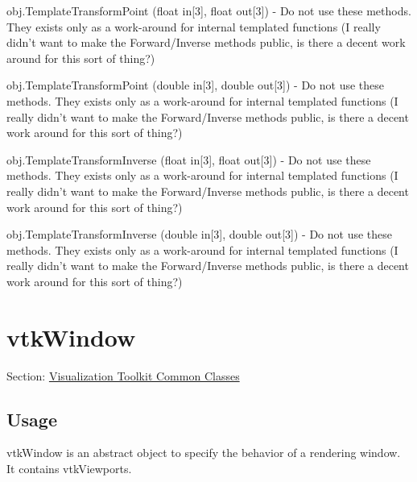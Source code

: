 \begin{DoxyItemize}
\item {\ttfamily obj.\-Template\-Transform\-Point (float in\mbox{[}3\mbox{]}, float out\mbox{[}3\mbox{]})} -\/ Do not use these methods. They exists only as a work-\/around for internal templated functions (I really didn't want to make the Forward/\-Inverse methods public, is there a decent work around for this sort of thing?)  
\item {\ttfamily obj.\-Template\-Transform\-Point (double in\mbox{[}3\mbox{]}, double out\mbox{[}3\mbox{]})} -\/ Do not use these methods. They exists only as a work-\/around for internal templated functions (I really didn't want to make the Forward/\-Inverse methods public, is there a decent work around for this sort of thing?)  
\item {\ttfamily obj.\-Template\-Transform\-Inverse (float in\mbox{[}3\mbox{]}, float out\mbox{[}3\mbox{]})} -\/ Do not use these methods. They exists only as a work-\/around for internal templated functions (I really didn't want to make the Forward/\-Inverse methods public, is there a decent work around for this sort of thing?)  
\item {\ttfamily obj.\-Template\-Transform\-Inverse (double in\mbox{[}3\mbox{]}, double out\mbox{[}3\mbox{]})} -\/ Do not use these methods. They exists only as a work-\/around for internal templated functions (I really didn't want to make the Forward/\-Inverse methods public, is there a decent work around for this sort of thing?)  
\end{DoxyItemize}\hypertarget{vtkcommon_vtkwindow}{}\section{vtk\-Window}\label{vtkcommon_vtkwindow}
Section\-: \hyperlink{sec_vtkcommon}{Visualization Toolkit Common Classes} \hypertarget{vtkwidgets_vtkxyplotwidget_Usage}{}\subsection{Usage}\label{vtkwidgets_vtkxyplotwidget_Usage}
vtk\-Window is an abstract object to specify the behavior of a rendering window. It contains vtk\-Viewports.

